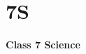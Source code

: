 \label{3 C7 Science}
    \section{7S}
    \begin{frame}
    \begin{center}
    \begin{Huge}
        \textbf{Class 7 Science}
    \end{Huge}
    \end{center}
    \end{frame}
 
    
